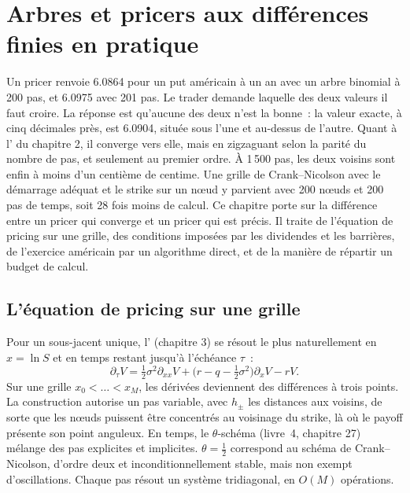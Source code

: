 \chapter{Arbres et pricers aux différences finies en pratique}\label{ch:dv:trees-and-finite-difference-pricers-in-practice}

Un pricer renvoie 6.0864 pour un put américain à un an avec un arbre binomial à 200 pas, et 6.0975 avec 201 pas. Le trader
demande laquelle des deux valeurs il faut croire. La réponse est qu'aucune des deux n'est la bonne~: la valeur exacte, à cinq décimales près, est 6.0904, située sous l'une et au-dessus de l'autre. Quant
à l' du chapitre 2, il converge vers elle, mais en zigzaguant selon la parité du nombre de pas,
et seulement au premier ordre. À 1\,500 pas, les deux voisins sont enfin à moins d'un centième de centime. Une grille de Crank--Nicolson avec le
démarrage adéquat et le strike sur un nœud y parvient avec 200 nœuds et 200 pas de temps, soit 28 fois moins de calcul. Ce chapitre porte sur
la différence entre un pricer qui converge et un pricer qui est précis. Il traite de l'équation de pricing sur une grille, des conditions
imposées par les dividendes et les barrières, de l'exercice américain par un algorithme direct, et de la manière de répartir un budget de calcul.

\section{L'équation de pricing sur une grille}

Pour un sous-jacent unique, l' (chapitre 3) se résout le plus naturellement en $x=\ln S$ et en temps restant jusqu'à l'échéance
$\tau$~:
\[
\partial_\tau V=\tfrac12\sigma^2\partial_{xx}V+\bigl(r-q-\tfrac12\sigma^2\bigr)\partial_xV-rV.
\]
Sur une grille $x_0<\dots<x_M$, les dérivées deviennent des différences à trois points. La construction autorise un pas variable, avec
$h_\pm$ les distances aux voisins, de sorte que les nœuds puissent être concentrés au voisinage du strike, là où le payoff présente son point anguleux.
En temps, le $\theta$-schéma (livre~4, chapitre 27) mélange des pas explicites et implicites. $\theta=\frac12$ correspond
au schéma de Crank--Nicolson, d'ordre deux et inconditionnellement stable, mais non exempt d'oscillations. Chaque pas résout un
système tridiagonal, en $O(M)$ opérations.

